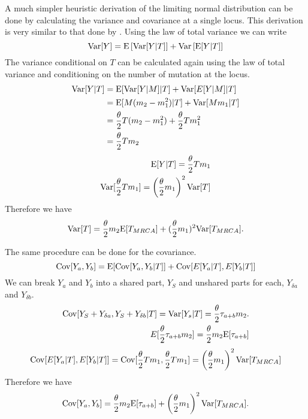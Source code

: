 A much simpler heuristic derivation of the limiting normal distribution can be
done by calculating the variance and covariance at a single locus. This
derivation is very similar to that done by \citet{Schraiber2015}. Using the law
of total variance we can write
\begin{equation*}
  \mathrm{Var}[Y] = \mathrm{E}\left[\mathrm{Var}[Y|T]\right] +
  \mathrm{Var}\left[\mathrm{E}[Y|T]\right]
\end{equation*}
The variance conditional on $T$ can be calculated again using the law of total
variance and conditioning on the number of mutation at the locus. 
\begin{align*}
  \mathrm{Var}[Y|T] &= \mathrm{E}[\mathrm{Var}[Y|M]|T] + \mathrm{Var}[E[Y|M]|T]\\
            &= \mathrm{E}[M(m_2-m_1^2)|T] + \mathrm{Var}[Mm_1|T]\\
            &= \frac{\theta}{2} T (m_2-m_1^2) + \frac{\theta}{2} T m_1^2\\
            &= \frac{\theta}{2} T m_2
\end{align*}
\begin{align*}
  \mathrm{E}[Y|T] = \frac{\theta}{2} T m_1\\
  \mathrm{Var}[\frac{\theta}{2} T m_1] = \left( \frac{\theta}{2} m_1\right)^2\mathrm{Var}[T]
\end{align*}
Therefore we have
\begin{equation}
  \mathrm{Var}[T] = \frac{\theta}{2} m_2 \mathrm{E}[T_{MRCA}] + (\frac{\theta}{2} m_1)^2 \mathrm{Var}[T_{MRCA}].
\end{equation}

The same procedure can be done for the covariance.
\begin{equation*}
  \mathrm{Cov}[Y_a,Y_b] = \mathrm{E}[\mathrm{Cov}[Y_a,Y_b|T]] + \mathrm{Cov}[E[Y_a|T],E[Y_b|T]]
\end{equation*}
We can break $Y_a$ and $Y_b$ into a shared part, $Y_S$ and unshared parts for
each, $Y_{\delta a}$ and $Y_{\delta b}$.
\begin{align*}
  \mathrm{Cov}[Y_S + Y_{\delta a}, Y_S + Y_{\delta b}|T] = \mathrm{Var}[Y_s|T] = \frac{\theta}{2} \tau_{a+b} m_2.\\
  E[\frac{\theta}{2} \tau_{a+b} m_2] = \frac{\theta}{2} m_2\mathrm{E}[\tau_{a+b}]
\end{align*}
\begin{align*}
  \mathrm{Cov}[E[Y_a|T],E[Y_b|T]] = \mathrm{Cov}[\frac{\theta}{2} T m_1, \frac{\theta}{2} T m_1] = \left( \frac{\theta}{2} m_1 \right)^2\mathrm{Var}[T_{MRCA}]
\end{align*}
Therefore we have
\begin{equation}
  \mathrm{Cov}[Y_a,Y_b] = \frac{\theta}{2} m_2 \mathrm{E}[\tau_{a+b}] + \left( \frac{\theta}{2} m_1 \right)^2 \mathrm{Var}[T_{MRCA}].
\end{equation}
